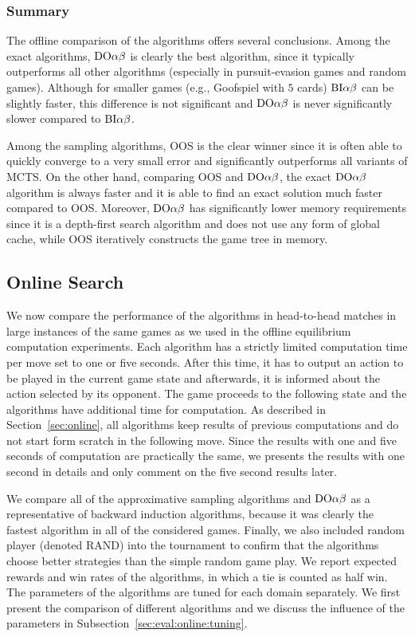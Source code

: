 \subsubsection{Summary}

The offline comparison of the algorithms offers several conclusions.
Among the exact algorithms, $\textrm{DO}\alpha\beta$ is clearly the best algorithm, since it typically outperforms all other algorithms (especially in pursuit-evasion games and random games). Although for smaller games (e.g., Goofspiel with $5$ cards)  $\textrm{BI}\alpha\beta$ can be slightly faster, this difference is not significant and $\textrm{DO}\alpha\beta$ is never significantly slower compared to $\textrm{BI}\alpha\beta$.

Among the sampling algorithms, OOS is the clear winner since it is often able to quickly converge to a very small error and significantly outperforms all variants of MCTS.
On the other hand, comparing OOS and $\textrm{DO}\alpha\beta$, the exact $\textrm{DO}\alpha\beta$ algorithm is always faster and it is able to find an exact solution much faster compared to OOS.
Moreover, $\textrm{DO}\alpha\beta$ has significantly lower memory requirements since it is a depth-first search algorithm and does not use any form of global cache, while OOS iteratively constructs the game tree in memory.


\subsection{Online Search}

We now compare the performance of the algorithms in head-to-head matches in large instances of the same games as we used in the offline equilibrium computation experiments. Each algorithm has a strictly limited computation time per move set to one or five seconds. After this time, it has to output an action to be played in the current game state and afterwards, it is informed about the action selected by its opponent. The game proceeds to the following state and the algorithms have additional time for computation. As described in Section~\ref{sec:online}, all algorithms keep results of previous computations and do not start form scratch in the following move. Since the results with one and five seconds of computation are practically the same, we presents the results with one second in details and only comment on the five second results later.

We compare all of the approximative sampling algorithms and $\textrm{DO}\alpha\beta$ as a representative of backward induction algorithms, because it was clearly the fastest algorithm in all of the considered games.
Finally, we also included random player (denoted RAND) into the tournament to confirm that the algorithms choose better strategies than the simple random game play.
We report expected rewards and win rates of the algorithms, in which a tie is counted as half win.
The parameters of the algorithms are tuned for each domain separately.
We first present the comparison of different algorithms and we discuss the influence of the parameters in Subsection~\ref{sec:eval:online:tuning}.


